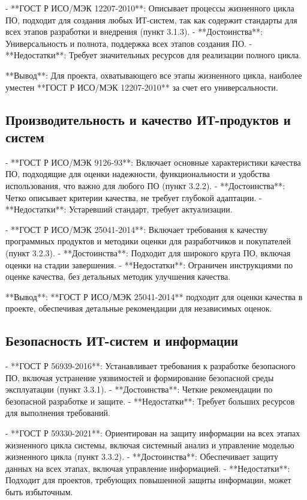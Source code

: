 - **ГОСТ Р ИСО/МЭК 12207-2010**: Описывает процессы жизненного цикла ПО, подходит для создания любых ИТ-систем, так как содержит стандарты для всех этапов разработки и внедрения (пункт 3.1.3).
  - **Достоинства**: Универсальность и полнота, поддержка всех этапов создания ПО.
  - **Недостатки**: Требует значительных ресурсов для реализации полного цикла.

**Вывод**: Для проекта, охватывающего все этапы жизненного цикла, наиболее уместен **ГОСТ Р ИСО/МЭК 12207-2010** за счет его универсальности.

\subsection{Производительность и качество ИТ-продуктов и систем}

- **ГОСТ Р ИСО/МЭК 9126-93**: Включает основные характеристики качества ПО, подходящие для оценки надежности, функциональности и удобства использования, что важно для любого ПО (пункт 3.2.2).
  - **Достоинства**: Четко описывает критерии качества, не требует глубокой адаптации.
  - **Недостатки**: Устаревший стандарт, требует актуализации.

- **ГОСТ Р ИСО/МЭК 25041-2014**: Включает требования к качеству программных продуктов и методики оценки для разработчиков и покупателей (пункт 3.2.3).
  - **Достоинства**: Подходит для широкого круга ПО, включая оценки на стадии завершения.
  - **Недостатки**: Ограничен инструкциями по оценке качества, без детальных методик улучшения качества.

**Вывод**: **ГОСТ Р ИСО/МЭК 25041-2014** подходит для оценки качества в проекте, обеспечивая детальные рекомендации для независимых оценок.

\subsection{Безопасность ИТ-систем и информации}

- **ГОСТ Р 56939-2016**: Устанавливает требования к разработке безопасного ПО, включая устранение уязвимостей и формирование безопасной среды эксплуатации (пункт 3.3.1).
  - **Достоинства**: Четкие рекомендации по безопасной разработке и защите.
  - **Недостатки**: Требует больших ресурсов для выполнения требований.

- **ГОСТ Р 59330-2021**: Ориентирован на защиту информации на всех этапах жизненного цикла системы, включая системный анализ и управление моделью жизненного цикла (пункт 3.3.2).
  - **Достоинства**: Обеспечивает защиту данных на всех этапах, включая управление информацией.
  - **Недостатки**: Подходит для проектов, требующих повышенной защиты информации, может быть избыточным.


